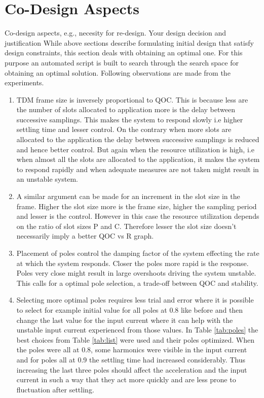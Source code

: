 \section{Co-Design Aspects}
\label{sec:codesign}
\color{red}
Co-design	aspects,	e.g.,	necesity for	re-design.	Your	design	decision	and	justification
\color{black}
While above sections describe formulating initial design that satisfy design constraints, this section deals with obtaining an optimal one. For this purpose an automated script is built to search through the search space for obtaining an optimal solution. Following observations are made from the experiments.

\begin{enumerate}
	\item TDM frame size is inversely proportional to QOC. This is because less are the number of slots allocated to application more is the delay between successive samplings. This makes the system to respond slowly i.e higher settling time and lesser control. On the contrary when more slots are allocated to the application the delay between successive samplings is reduced and hence better control. But again when the resource utilization is high, i.e when almost all the slots are allocated to the application, it makes the system to respond rapidly and when adequate measures are not taken might result in an unstable system.
	
	\item A similar argument can be made for an increment in the slot size in the frame. Higher the slot size more is the frame size, higher the sampling period and lesser is the control. However in this case the resource utilization depends on the ratio of slot sizes P and C. Therefore lesser the slot size  doesn't necessarily imply a better QOC vs R graph.
	
	\item Placement of poles control the damping factor of the system effecting the rate at which the system responds. Closer the poles more rapid is the response. Poles very close might result in large overshoots driving the system unstable. This calls for a optimal pole selection, a trade-off between QOC and stability.
	
		\item Selecting more optimal poles requires less trial and error where it is possible to select for example initial value for all poles at 0.8 like before and then change the last value for the input current where it can help with the unstable input current experienced from those values. In Table \ref{tab:poles} the best choices from Table \ref{tab:list} were used and their poles optimized. When the poles were all at 0.8, some harmonics were visible in the input current and for poles all at 0.9 the settling time had increased considerably. Thus increasing the last three poles should affect the acceleration and the input current in such a way that they act more quickly and are less prone to fluctuation after settling.
		

\end{enumerate}
